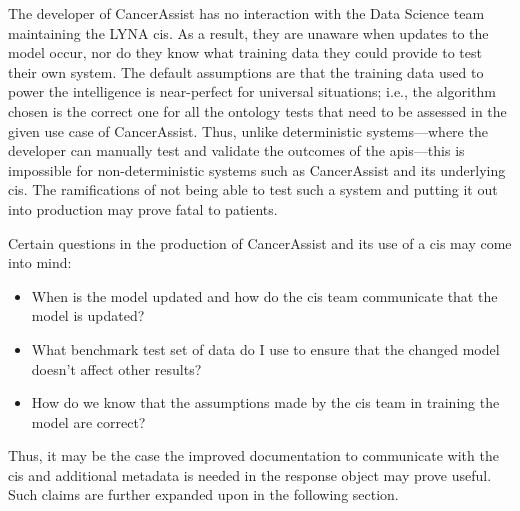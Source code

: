 The developer of CancerAssist has no interaction with the Data Science team maintaining the LYNA \gls{cis}. As a result, they are unaware when updates to the model occur, nor do they know what training data they could provide to test their own system. The default assumptions are that the training data used to power the intelligence is near-perfect for universal situations; i.e., the algorithm chosen is the correct one for all the ontology tests that need to be assessed in the given use case of CancerAssist. Thus, unlike deterministic systems---where the developer can manually test and validate the outcomes of the \glspl{api}---this is impossible for non-deterministic systems such as CancerAssist and its underlying \gls{cis}. The ramifications of not being able to test such a system and putting it out into production may prove fatal to patients.

Certain questions in the production of CancerAssist and its use of a \gls{cis} may come into mind:

\begin{itemize}
  \item When is the model updated and how do the \gls{cis} team communicate that the model is updated?
  \item What benchmark test set of data do I use to ensure that the changed model doesn't affect other results?
  \item How do we know that the assumptions made by the \gls{cis} team in training the model are correct?
\end{itemize}

Thus, it may be the case the improved documentation to communicate with the \gls{cis} and additional metadata is needed in the response object may prove useful. Such claims are further expanded upon in the following section.

